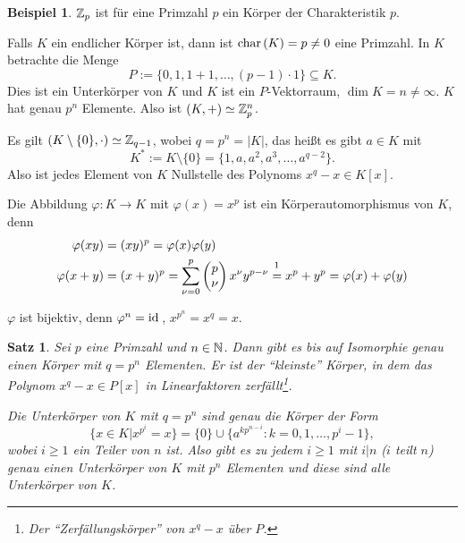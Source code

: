 \documentclass[
 a4paper,
 12pt,
 parskip=half
 ]{scrartcl}
\theoremstyle{plain}
\newtheorem*{thm*}{Satz}
\theoremstyle{definition}
\newtheorem*{exmp*}{Beispiel}
\begin{document}
\begin{exmp*}
 $\mathbb{Z}_p$ ist für eine Primzahl $p$ ein Körper der Charakteristik $p$.  
\end{exmp*}

Falls $K$ ein endlicher Körper ist, dann ist $\mathrm{char}\,(K) = p \ne 0$ eine Primzahl. In $K$ betrachte die Menge
\[ P := \{ 0, 1, 1+1, \ldots, (p-1) \cdot 1 \} \subseteq K. \]
Dies ist ein Unterkörper von $K$ und $K$ ist ein $P$-Vektorraum, $\dim K = n \ne \infty$. $K$ hat genau $p^n$ Elemente. Also ist $(K,+) \simeq \mathbb{Z}_p^n$.

Es gilt $(K \setminus \{ 0 \}, \cdot ) \simeq \mathbb{Z}_{q-1}$, wobei $q = p^n = |K|$, das heißt es gibt $a \in K$ mit
\[ K^* := K \setminus \{ 0 \} = \{ 1, a, a^2, a^3, \ldots, a^{q-2} \}. \]
Also ist jedes Element von $K$ Nullstelle des Polynoms $x^q - x \in K[x]$. 

Die Abbildung $\varphi: K \to K$ mit $\varphi(x) = x^p$ ist ein Körperautomorphismus von $K$, denn
\begin{align*}
 \varphi(xy) &= (xy)^p = \varphi(x) \varphi(y) \\
 \varphi(x+y) &= (x+y)^p = \sum_{\nu = 0}^p \begin{pmatrix} p \\ \nu \end{pmatrix} x^\nu y^{p-\nu} \overset{\footnotemark}{=} x^p + y^p = \varphi(x) + \varphi(y)
\end{align*}

$\varphi$ ist bijektiv, denn $\varphi^n = \mathrm{id}\,$,  $x^{p^n} = x^q = x$.

\begin{thm*}
 Sei $p$ eine Primzahl und $n \in \mathbb{N}$. Dann gibt es bis auf Isomorphie genau einen Körper mit $q=p^n$ Elementen. Er ist der ``kleinste'' Körper, in dem das Polynom $x^q - x \in P[x]$ in Linearfaktoren zerfällt\footnote{Der ``Zerfällungskörper'' von $x^q - x$ über $P$.}.
 
 Die Unterkörper von $K$ mit $q = p^n$ sind genau die Körper der Form 
 \[ \{ x \in K | x^{p^i} = x \} = \{ 0 \} \cup \{ a^{k p^{n-i}} : k = 0, 1, \ldots, p^i -1 \},\]
 wobei $i \ge 1$ ein Teiler von $n$ ist. Also gibt es zu jedem $i \ge 1$ mit $i|n$ ($i$ teilt $n$) genau einen Unterkörper von $K$ mit $p^n$ Elementen und diese sind alle Unterkörper von $K$.
\end{thm*}
\end{document}
